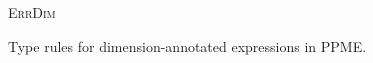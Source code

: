 \begin{figure}[t]
\begin{center}
\begin{prooftree}[separation=1em]
        \end{prooftree}
      \end{center}
      \begin{center}
        \textsc{ErrDim}
        \begin{prooftree}[separation=1em]
        \end{prooftree}
      \end{center}
      \caption{Type rules for dimension-annotated expressions in PPME.}
      \label{fig:dimension_rules}
    \end{figure}

